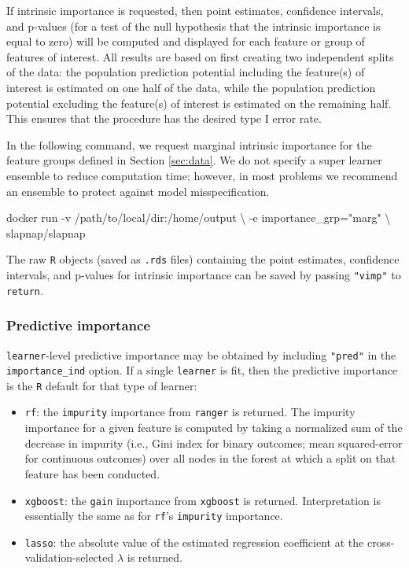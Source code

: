 \documentclass[]{article}
\newenvironment{Shaded}{\begin{snugshade}}{\end{snugshade}}
\newcommand{\StringTok}[1]{\textcolor[rgb]{0.31,0.60,0.02}{#1}}
\newcommand{\ExtensionTok}[1]{#1}
\newcommand{\NormalTok}[1]{#1}
\providecommand{\tightlist}{%
  \setlength{\itemsep}{0pt}\setlength{\parskip}{0pt}}
\begin{document}
If intrinsic importance is requested, then point estimates, confidence
intervals, and p-values (for a test of the null hypothesis that the
intrinsic importance is equal to zero) will be computed and displayed
for each feature or group of features of interest. All results are based
on first creating two independent splits of the data: the population
prediction potential including the feature(s) of interest is estimated
on one half of the data, while the population prediction potential
excluding the feature(s) of interest is estimated on the remaining half.
This ensures that the procedure has the desired type I error rate.

In the following command, we request marginal intrinsic importance for
the feature groups defined in Section \ref{sec:data}. We do not specify
a super learner ensemble to reduce computation time; however, in most
problems we recommend an ensemble to protect against model
misspecification.

\begin{Shaded}
\begin{Highlighting}[]
\ExtensionTok{docker}\NormalTok{ run -v /path/to/local/dir:/home/output \textbackslash{}}
\NormalTok{           -e importance_grp=}\StringTok{"marg"}\NormalTok{ \textbackslash{}}
\NormalTok{           slapnap/slapnap}
\end{Highlighting}
\end{Shaded}

The raw \texttt{R} objects (saved as \texttt{.rds} files) containing the
point estimates, confidence intervals, and p-values for intrinsic
importance can be saved by passing \texttt{"vimp"} to \texttt{return}.

\subsubsection{Predictive importance}\label{predictive-importance}

\texttt{learner}-level predictive importance may be obtained by
including \texttt{"pred"} in the \texttt{importance\_ind} option. If a
single \texttt{learner} is fit, then the predictive importance is the
\texttt{R} default for that type of learner:

\begin{itemize}
\tightlist
\item
  \texttt{rf}: the \texttt{impurity} importance from \texttt{ranger}
  \citep{rangerpkg} is returned. The impurity importance for a given
  feature is computed by taking a normalized sum of the decrease in
  impurity (i.e., Gini index for binary outcomes; mean squared-error for
  continuous outcomes) over all nodes in the forest at which a split on
  that feature has been conducted.
\item
  \texttt{xgboost}: the \texttt{gain} importance from \texttt{xgboost}
  \citep{xgboostpkg} is returned. Interpretation is essentially the same
  as for \texttt{rf}'s \texttt{impurity} importance.
\item
  \texttt{lasso}: the absolute value of the estimated regression
  coefficient at the cross-validation-selected \(\lambda\) is returned.
\end{itemize}
\end{document}
